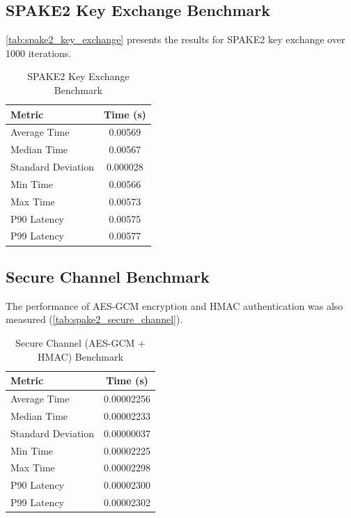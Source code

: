 \documentclass[twoside,a4paper,12pt]{article}
\begin{document}
\subsection{SPAKE2 Key Exchange Benchmark}
\autoref{tab:spake2_key_exchange} presents the results for SPAKE2 key exchange over 1000 iterations.

\begin{table}[H]
    \centering
    \renewcommand{\arraystretch}{1.2}
    \begin{tabular}{l c}
        \toprule
        \textbf{Metric} & \textbf{Time (s)} \\
        \midrule
        Average Time & 0.00569 \\
        Median Time & 0.00567 \\
        Standard Deviation & 0.000028 \\
        Min Time & 0.00566 \\
        Max Time & 0.00573 \\
        P90 Latency & 0.00575 \\
        P99 Latency & 0.00577 \\
        \bottomrule
    \end{tabular}
    \caption{SPAKE2 Key Exchange Benchmark}
    \label{tab:spake2_key_exchange}

\end{table}

\subsection{Secure Channel Benchmark}
The performance of AES-GCM encryption and HMAC authentication was also measured (\autoref{tab:spake2_secure_channel}).

\begin{table}[h]
    \centering
    \caption{Secure Channel (AES-GCM + HMAC) Benchmark}
    \label{tab:spake2_secure_channel}
    \renewcommand{\arraystretch}{1.2}
    \begin{tabular}{l c}
        \toprule
        \textbf{Metric} & \textbf{Time (s)} \\
        \midrule
        Average Time & 0.00002256 \\
        Median Time & 0.00002233 \\
        Standard Deviation & 0.00000037 \\
        Min Time & 0.00002225 \\
        Max Time & 0.00002298 \\
        P90 Latency & 0.00002300 \\
        P99 Latency & 0.00002302 \\
        \bottomrule
    \end{tabular}
\end{table}
\end{document}
